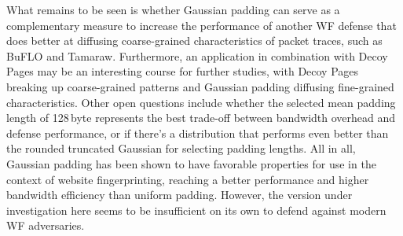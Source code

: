 \documentclass[
	ruledheaders=chapter,
	class=report,
	thesis={type=master, department=inf},
	accentcolor=1c,
	custommargins=true,
	marginpar=false,
	parskip=half-,
	fontsize=11pt,
]{tudapub}
\begin{document}
	What remains to be seen is whether Gaussian padding can serve as a complementary measure to increase the performance of another WF defense that does better at diffusing coarse-grained characteristics of packet traces, such as BuFLO and Tamaraw. Furthermore, an application in combination with Decoy Pages may be an interesting course for further studies, with Decoy Pages breaking up coarse-grained patterns and Gaussian padding diffusing fine-grained characteristics. Other open questions include whether the selected mean padding length of 128$\,$byte represents the best trade-off between bandwidth overhead and defense performance, or if there's a distribution that performs even better than the rounded truncated Gaussian for selecting padding lengths. All in all, Gaussian padding has been shown to have favorable properties for use in the context of website fingerprinting, reaching a better performance and higher bandwidth efficiency than uniform padding. However, the version under investigation here seems to be insufficient on its own to defend against modern WF adversaries.

	\pagebreak
	\setcounter{page}{5}
	\printbibliography

	\cleardoublepage
	\listoffigures

	\cleardoublepage
	\listoftables
\end{document}
